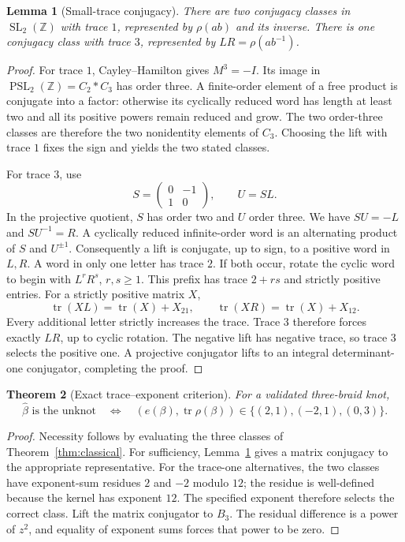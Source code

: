 \documentclass[11pt,letterpaper]{article}
\newtheorem{theorem}{Theorem}[section]
\newtheorem{lemma}[theorem]{Lemma}
\theoremstyle{definition}
\newcommand{\Z}{\mathbb Z}
\newcommand{\SL}{\operatorname{SL}}
\newcommand{\PSL}{\operatorname{PSL}}
\newcommand{\tr}{\operatorname{tr}}
\begin{document}
\begin{lemma}[Small-trace conjugacy]
\label{lem:trace}
There are two conjugacy classes in \(\SL_2(\Z)\) with trace \(1\),
represented by \(\rho(ab)\) and its inverse. There is one conjugacy class
with trace \(3\), represented by \(LR=\rho(ab^{-1})\).
\end{lemma}
\begin{proof}
For trace \(1\), Cayley--Hamilton gives \(M^3=-I\).
Its image in \(\PSL_2(\Z)=C_2*C_3\) has order three.
A finite-order element of a free product is conjugate into a factor:
otherwise its cyclically reduced word has length at least two and all its
positive powers remain reduced and grow. The two order-three classes are
therefore the two nonidentity elements of \(C_3\).
Choosing the lift with trace \(1\) fixes the sign and yields the two stated
classes.

For trace \(3\), use
\[
 S=\begin{pmatrix}0&-1\\1&0\end{pmatrix},\qquad U=SL.
\]
In the projective quotient, \(S\) has order two and \(U\) order three.
We have \(SU=-L\) and \(SU^{-1}=R\). A cyclically reduced
infinite-order word is an alternating product of \(S\) and \(U^{\pm1}\).
Consequently a lift is conjugate, up to sign, to a positive word in \(L,R\).
A word in only one letter has trace \(2\). If both occur, rotate the
cyclic word to begin with \(L^rR^s\), \(r,s\ge1\).
This prefix has trace \(2+rs\) and strictly positive entries.
For a strictly positive matrix \(X\),
\[
 \tr(XL)=\tr(X)+X_{21},\qquad
 \tr(XR)=\tr(X)+X_{12}.
\]
Every additional letter strictly increases the trace. Trace \(3\)
therefore forces exactly \(LR\), up to cyclic rotation.
The negative lift has negative trace, so trace \(3\) selects the positive
one. A projective conjugator lifts to an integral determinant-one
conjugator, completing the proof.
\end{proof}

\begin{theorem}[Exact trace--exponent criterion]
\label{thm:matrix}
For a validated three-braid knot,
\begin{equation}
\label{eq:matrixcriterion}
 \widehat\beta\text{ is the unknot}
 \quad\Longleftrightarrow\quad
 (e(\beta),\tr\rho(\beta))
 \in\{(2,1),(-2,1),(0,3)\}.
\end{equation}
\end{theorem}
\begin{proof}
Necessity follows by evaluating the three classes of
Theorem~\ref{thm:classical}. For sufficiency, Lemma~\ref{lem:trace}
gives a matrix conjugacy to the appropriate representative.
For the trace-one alternatives, the two classes have exponent-sum
residues \(2\) and \(-2\) modulo \(12\); the residue is well-defined
because the kernel has exponent \(12\).
The specified exponent therefore selects the correct class.
Lift the matrix conjugator to \(B_3\). The residual difference is a power
of \(z^2\), and equality of exponent sums forces that power to be zero.
\end{proof}
\end{document}
